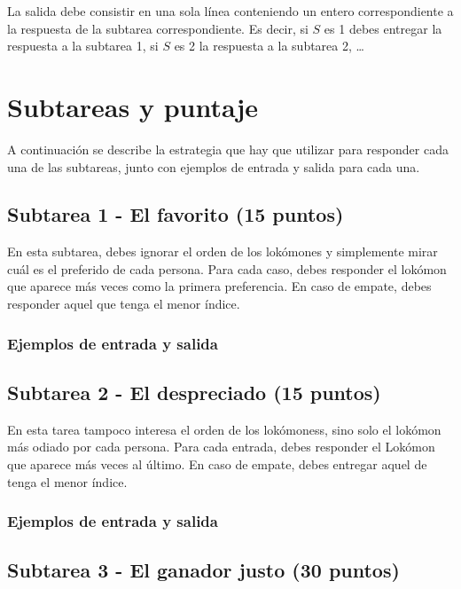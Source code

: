\documentclass{oci}
\begin{document}
\begin{outputDescription}
La salida debe consistir en una sola línea conteniendo un entero correspondiente
a la respuesta de la subtarea correspondiente.
Es decir, si $S$ es 1 debes entregar la respuesta a la subtarea 1, si $S$ es 2
la respuesta a la subtarea 2, \dots

\section*{Subtareas y puntaje}
A continuación se describe la estrategia que hay que utilizar para responder
cada una de las subtareas, junto con ejemplos de entrada y salida para cada una.

\subsection*{Subtarea 1 - El favorito (15 puntos)}
En esta subtarea, debes ignorar el orden de los lokómones y simplemente
mirar cuál es el preferido de cada persona.
Para cada caso, debes responder el lokómon que aparece
más veces como la primera preferencia.
En caso de empate, debes responder aquel que tenga el menor índice. 

\renewenvironment{sampleDescription}{\subsubsection*{Ejemplos de entrada y salida}}{}

\begin{sampleDescription}
\end{sampleDescription}

\subsection*{Subtarea 2 - El despreciado (15 puntos)}

En esta tarea tampoco interesa el orden de los lokómoness, sino solo el lokómon
más odiado por cada persona.
Para cada entrada, debes responder el Lokómon que aparece más veces al último.
En caso de empate, debes entregar aquel de tenga el menor índice.

\begin{sampleDescription}
\end{sampleDescription}

\subsection*{Subtarea 3 - El ganador justo (30 puntos)}


\end{outputDescription}
\end{document}
